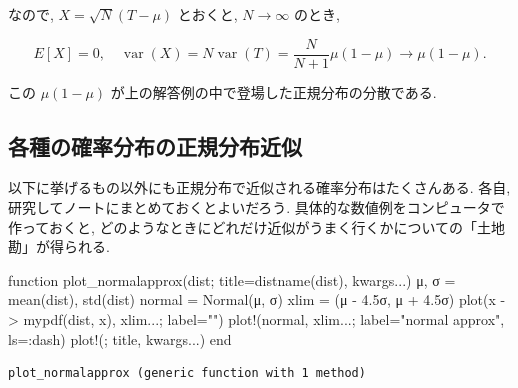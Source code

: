 \documentclass[
  letterpaper,
  DIV=11,
  numbers=noendperiod]{scrartcl}
\newenvironment{Shaded}{\begin{snugshade}}{\end{snugshade}}
\newcommand{\FloatTok}[1]{\textcolor[rgb]{0.68,0.00,0.00}{#1}}
\newcommand{\FunctionTok}[1]{\textcolor[rgb]{0.28,0.35,0.67}{#1}}
\newcommand{\KeywordTok}[1]{\textcolor[rgb]{0.00,0.23,0.31}{#1}}
\newcommand{\NormalTok}[1]{\textcolor[rgb]{0.00,0.23,0.31}{#1}}
\newcommand{\OperatorTok}[1]{\textcolor[rgb]{0.37,0.37,0.37}{#1}}
\newcommand{\StringTok}[1]{\textcolor[rgb]{0.13,0.47,0.30}{#1}}
\begin{document}
なので, \(X = \sqrt{N}(T - \mu)\) とおくと, \(N\to\infty\) のとき,

\[
E[X] = 0, \quad
\operatorname{var}(X) = N\operatorname{var}(T) = \frac{N}{N+1}\mu(1-\mu) \to \mu(1-\mu).
\]

この \(\mu(1-\mu)\) が上の解答例の中で登場した正規分布の分散である.

\hypertarget{ux5404ux7a2eux306eux78baux7387ux5206ux5e03ux306eux6b63ux898fux5206ux5e03ux8fd1ux4f3c}{%
\subsection{各種の確率分布の正規分布近似}\label{ux5404ux7a2eux306eux78baux7387ux5206ux5e03ux306eux6b63ux898fux5206ux5e03ux8fd1ux4f3c}}

以下に挙げるもの以外にも正規分布で近似される確率分布はたくさんある.
各自, 研究してノートにまとめておくとよいだろう.
具体的な数値例をコンピュータで作っておくと,
どのようなときにどれだけ近似がうまく行くかについての「土地勘」が得られる.

\begin{Shaded}
\begin{Highlighting}[]
\KeywordTok{function} \FunctionTok{plot\_normalapprox}\NormalTok{(dist; title}\OperatorTok{=}\FunctionTok{distname}\NormalTok{(dist), kwargs}\OperatorTok{...}\NormalTok{)}
\NormalTok{    μ, σ }\OperatorTok{=} \FunctionTok{mean}\NormalTok{(dist), }\FunctionTok{std}\NormalTok{(dist)}
\NormalTok{    normal }\OperatorTok{=} \FunctionTok{Normal}\NormalTok{(μ, σ)}
\NormalTok{    xlim }\OperatorTok{=}\NormalTok{ (μ }\OperatorTok{{-}} \FloatTok{4.5}\NormalTok{σ, μ }\OperatorTok{+} \FloatTok{4.5}\NormalTok{σ)}
    \FunctionTok{plot}\NormalTok{(x }\OperatorTok{{-}\textgreater{}} \FunctionTok{mypdf}\NormalTok{(dist, x), xlim}\OperatorTok{...}\NormalTok{; label}\OperatorTok{=}\StringTok{""}\NormalTok{)}
    \FunctionTok{plot!}\NormalTok{(normal, xlim}\OperatorTok{...}\NormalTok{; label}\OperatorTok{=}\StringTok{"normal approx"}\NormalTok{, ls}\OperatorTok{=:}\NormalTok{dash)}
    \FunctionTok{plot!}\NormalTok{(; title, kwargs}\OperatorTok{...}\NormalTok{)}
\KeywordTok{end}
\end{Highlighting}
\end{Shaded}

\begin{verbatim}
plot_normalapprox (generic function with 1 method)
\end{verbatim}
\end{document}
